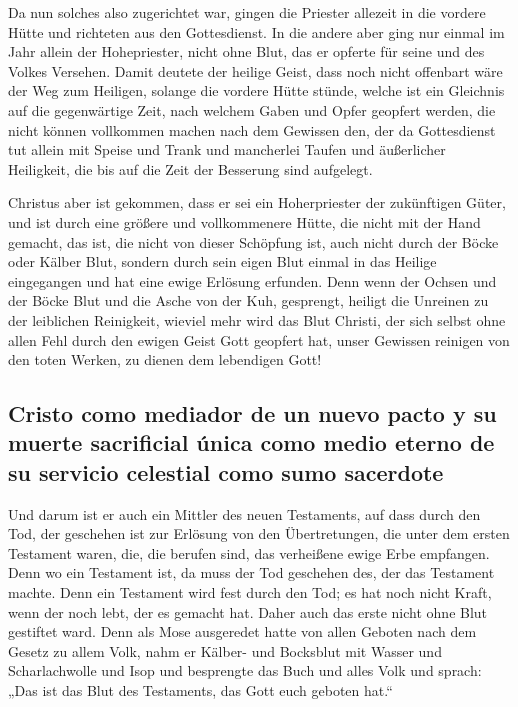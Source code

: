  Da nun solches also zugerichtet war, gingen die Priester
allezeit in die vordere Hütte und richteten aus den Gottesdienst.
 In die andere aber ging nur einmal im Jahr allein der
Hohepriester, nicht ohne Blut, das er opferte für seine und des Volkes
Versehen.  Damit deutete der heilige Geist, dass noch
nicht offenbart wäre der Weg zum Heiligen, solange die vordere Hütte
stünde,  welche ist ein Gleichnis auf die gegenwärtige
Zeit, nach welchem Gaben und Opfer geopfert werden, die nicht können
vollkommen machen nach dem Gewissen den, der da Gottesdienst tut
 allein mit Speise und Trank und mancherlei Taufen und
äußerlicher Heiligkeit, die bis auf die Zeit der Besserung sind
aufgelegt.

 Christus aber ist gekommen, dass er sei ein
Hoherpriester der zukünftigen Güter, und ist durch eine größere und
vollkommenere Hütte, die nicht mit der Hand gemacht, das ist, die nicht
von dieser Schöpfung ist,  auch nicht durch der Böcke
oder Kälber Blut, sondern durch sein eigen Blut einmal in das Heilige
eingegangen und hat eine ewige Erlösung erfunden.  Denn
wenn der Ochsen und der Böcke Blut und die Asche von der Kuh, gesprengt,
heiligt die Unreinen zu der leiblichen Reinigkeit, 
wieviel mehr wird das Blut Christi, der sich selbst ohne allen Fehl
durch den ewigen Geist Gott geopfert hat, unser Gewissen reinigen von
den toten Werken, zu dienen dem lebendigen Gott!

\hypertarget{cristo-como-mediador-de-un-nuevo-pacto-y-su-muerte-sacrificial-uxfanica-como-medio-eterno-de-su-servicio-celestial-como-sumo-sacerdote}{%
\subsection{Cristo como mediador de un nuevo pacto y su muerte
sacrificial única como medio eterno de su servicio celestial como sumo
sacerdote}\label{cristo-como-mediador-de-un-nuevo-pacto-y-su-muerte-sacrificial-uxfanica-como-medio-eterno-de-su-servicio-celestial-como-sumo-sacerdote}}

 Und darum ist er auch ein Mittler des neuen Testaments,
auf dass durch den Tod, der geschehen ist zur Erlösung von den
Übertretungen, die unter dem ersten Testament waren, die, die berufen
sind, das verheißene ewige Erbe empfangen.  Denn wo ein
Testament ist, da muss der Tod geschehen des, der das Testament machte.
 Denn ein Testament wird fest durch den Tod; es hat noch
nicht Kraft, wenn der noch lebt, der es gemacht hat. 
Daher auch das erste nicht ohne Blut gestiftet ward. 
Denn als Mose ausgeredet hatte von allen Geboten nach dem Gesetz zu
allem Volk, nahm er Kälber- und Bocksblut mit Wasser und Scharlachwolle
und Isop und besprengte das Buch und alles Volk  und
sprach: „Das ist das Blut des Testaments, das Gott euch geboten hat.``

